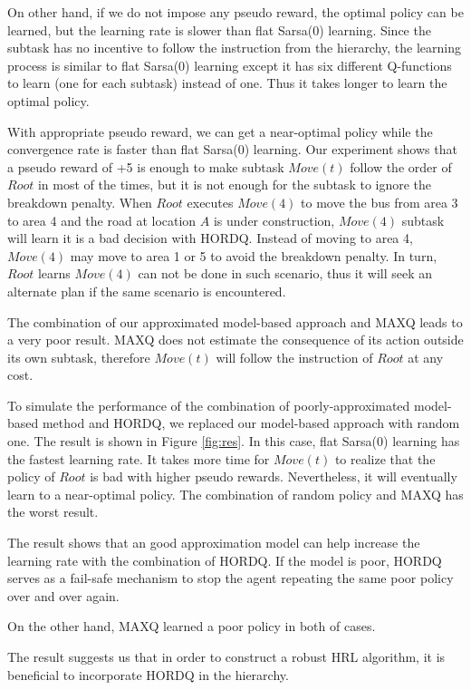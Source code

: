 \documentclass{article} %
\begin{document}
On other hand, if we do not impose any pseudo reward, 
the optimal policy can be learned, but the learning rate is
slower than flat Sarsa(0) learning. Since the subtask has no
incentive to follow the instruction from the hierarchy, 
the learning process is similar to flat Sarsa(0) learning 
except it has six different Q-functions to learn (one for each subtask) instead of one.
Thus it takes longer to learn the optimal policy. 

With appropriate pseudo reward, we can get a near-optimal policy
while the convergence rate is faster than flat Sarsa(0) learning.
Our experiment shows that a pseudo reward of +5 is enough to make subtask $Move(t)$ follow 
the order of $Root$ in most of the times, but it is not enough for the subtask to ignore
the breakdown penalty. When $Root$ executes $Move(4)$ to move the bus from area 
3 to area 4 and the road at location $A$ is under construction, $Move(4)$ subtask
will learn it is a bad decision with HORDQ.
Instead of moving to area 4, $Move(4)$ may move to area 1 or 5 to avoid
the breakdown penalty. In turn, $Root$ learns $Move(4)$ can not be done in 
such scenario, thus it will seek an alternate plan if the same scenario
is encountered.

The combination of our approximated model-based approach and MAXQ leads 
to a very poor result. MAXQ does not estimate the consequence of its action outside its own subtask, therefore
$Move(t)$ will follow the instruction of $Root$ at any cost.

To simulate the performance of the combination of poorly-approximated model-based method and 
HORDQ, we replaced our model-based approach with random one.
The result is shown in Figure \ref{fig:res}. In this case, flat Sarsa(0) learning has the fastest
learning rate. It takes more time for $Move(t)$ to realize that the policy of $Root$ is bad with higher pseudo rewards.
Nevertheless, it will eventually learn to a near-optimal policy.
The combination of random policy and MAXQ has the worst result.

The result shows that an good approximation model 
can help increase the learning rate with the combination of HORDQ. 
If the model is poor, HORDQ serves as a fail-safe mechanism to stop 
the agent repeating the same poor policy over and over again.

On the other hand, MAXQ learned a poor policy in both of cases.  

The result suggests us that in order to construct a robust HRL 
algorithm, it is beneficial to incorporate HORDQ in the hierarchy.
\end{document}
